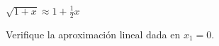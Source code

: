\setcounter{enumi}{36}
\item $\displaystyle \sqrt{1 + x} \approx 1 + \frac{1}{2}x$
\par
Verifique la aproximación lineal dada en $x_1 = 0$.
